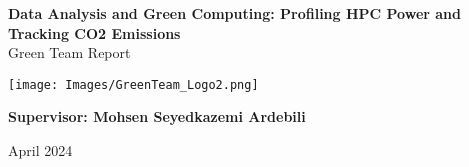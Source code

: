 \begin{titlepage}
    \begin{center}
    {\fontsize{25}{30}\selectfont \bfseries Data Analysis and Green Computing: Profiling HPC Power and Tracking CO2 Emissions} 
    \\\vspace{20pt}
    {\LARGE Green Team Report} \\
    \vspace{20pt}
    
    \vfill %

        \texttt{[image: Images/GreenTeam\_Logo2.png]}

        \vfill %
        \textbf{Supervisor: Mohsen Seyedkazemi Ardebili}

        April 2024
    \end{center}
\end{titlepage}
